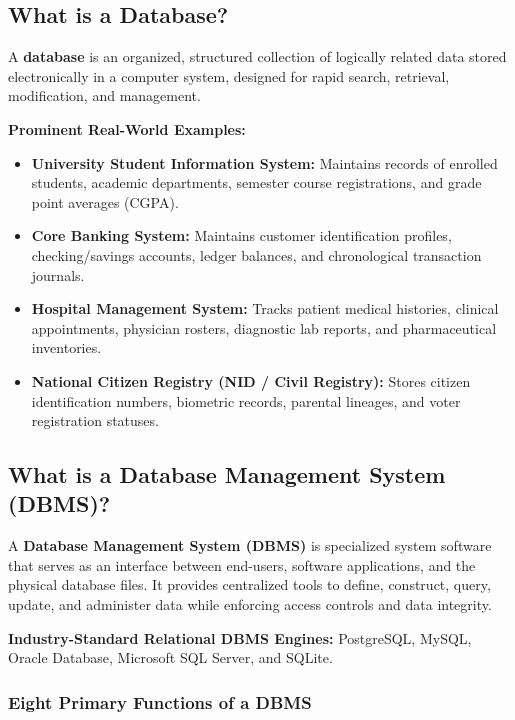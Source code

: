 \subsection{What is a Database?}

A \textbf{database} is an organized, structured collection of logically related data stored electronically in a computer system, designed for rapid search, retrieval, modification, and management.

\textbf{Prominent Real-World Examples:}
\begin{itemize}
\item \textbf{University Student Information System:} Maintains records of enrolled students, academic departments, semester course registrations, and grade point averages (CGPA).
\item \textbf{Core Banking System:} Maintains customer identification profiles, checking/savings accounts, ledger balances, and chronological transaction journals.
\item \textbf{Hospital Management System:} Tracks patient medical histories, clinical appointments, physician rosters, diagnostic lab reports, and pharmaceutical inventories.
\item \textbf{National Citizen Registry (NID / Civil Registry):} Stores citizen identification numbers, biometric records, parental lineages, and voter registration statuses.
\end{itemize}

\subsection{What is a Database Management System (DBMS)?}

A \textbf{Database Management System (DBMS)} is specialized system software that serves as an interface between end-users, software applications, and the physical database files. It provides centralized tools to define, construct, query, update, and administer data while enforcing access controls and data integrity.

\textbf{Industry-Standard Relational DBMS Engines:} PostgreSQL, MySQL, Oracle Database, Microsoft SQL Server, and SQLite.

\subsubsection{Eight Primary Functions of a DBMS}

